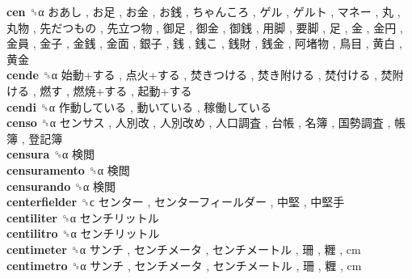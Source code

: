 \textbf{cen} ␝α   おあし ,  お足 ,  お金 ,  お銭 ,  ちゃんころ ,  ゲル ,  ゲルト ,  マネー ,  丸 ,  丸物 ,  先だつもの ,  先立つ物 ,  御足 ,  御金 ,  御銭 ,  用脚 ,  要脚 ,  足 ,  金 ,  金円 ,  金員 ,  金子 ,  金銭 ,  金面 ,  銀子 ,  銭 ,  銭こ ,  銭財 ,  銭金 ,  阿堵物 ,  鳥目 ,  黄白 ,  黄金   \\
\textbf{cende} ␝α   始動+する ,  点火+する ,  焚きつける ,  焚き附ける ,  焚付ける ,  焚附ける ,  燃す ,  燃焼+する ,  起動+する   \\
\textbf{cendi} ␝α   作動している ,  動いている ,  稼働している   \\
\textbf{censo} ␝α   センサス ,  人別改 ,  人別改め ,  人口調査 ,  台帳 ,  名簿 ,  国勢調査 ,  帳簿 ,  登記簿   \\
\textbf{censura} ␝α   検閲   \\
\textbf{censuramento} ␝α   検閲   \\
\textbf{censurando} ␝α   検閲   \\
\textbf{centerfielder} ␝ϲ   センター ,  センターフィールダー ,  中堅 ,  中堅手   \\
\textbf{centiliter} ␝α   センチリットル   \\
\textbf{centilitro} ␝α   センチリットル   \\
\textbf{centimeter} ␝α   サンチ ,  センチメータ ,  センチメートル ,  珊 ,  糎 , cm  \\
\textbf{centimetro} ␝α   サンチ ,  センチメータ ,  センチメートル ,  珊 ,  糎 , cm  \\
